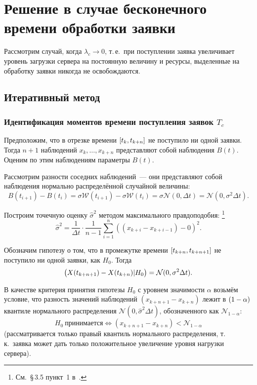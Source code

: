 \documentclass[a4paper,10pt]{article}
\begin{document}
\section{Решение в случае бесконечного времени обработки заявки}
Рассмотрим случай, когда $\lambda_c \rightarrow 0$, 
т.\,е.~при поступлении заявка увеличивает уровень загрузки 
сервера на постоянную величину и ресурсы, выделенные на обработку заявки
никогда не освобождаются.

\subsection{Итеративный метод}%
\label{iterative}
\subsubsection{Идентификация моментов времени поступления заявок $T_c$}%
\label{lc0-iter-Tc}
Предположим, что в отрезке времени $\sbr{t_k, t_{k+n}}$ 
не поступило ни одной заявки.
Тогда $n + 1$ наблюдений $x_k,\ldots,x_{k+n}$ представляют собой наблюдения
$B(t)$.
Оценим по этим наблюдениям параметры $B(t)$.

Рассмотрим разности соседних наблюдений~--- они представляют собой наблюдения 
нормально распределённой случайной величины:
$$B(t_{i+1}) - B(t_i) = 
    \sigma \mathcal{W}(t_{i+1}) - \sigma \mathcal{W}(t_i) = 
    \sigma \mathcal{N}(0, \Delta t) = 
    \mathcal{N}(0, \sigma^2 \Delta t).$$

Построим точечную оценку $\widehat{\sigma}^2$ 
методом максимального правдоподобия:%
\footnote{См.~\S\,3.5 пункт~1 в~\cite{ivchmed2010matstat}.}
%
$$\widehat{\sigma}^2 = 
    \frac{1}{\Delta t}\cdot\frac{1}{n-1}
        \sum\limits_{i=1}^n ((x_{k+i} - x_{k+i-1}) - 0)^2.$$

Обозначим гипотезу о том, что в промежутке времени 
$\sbr{t_{k+n}, t_{k+n+1}}$ не поступило ни одной заявки, 
как $H_0$.
Тогда 
$$\del{X(t_{k+n+1})-X(t_{k+n}) \vert H_0} = 
    \mathcal{N}(0, \sigma^2 \Delta t).$$

В качестве критерия принятия гипотезы $H_0$ с уровнем значимости 
$\alpha$ 
возьмём условие, что разность значений наблюдений $(x_{k+n+1}-x_{k+n})$
лежит в $\del{1 - \alpha}$ квантиле
нормального распределения $\mathcal{N}(0, \widehat{\sigma}^2 \Delta t)$,
обозначенного как $\mathcal{N}_{1 - \alpha}$:
$$
H_0 \  \mathrm{\text{принимается}} \iff
        (x_{k+n+1}-x_{k+n}) < 
	    \mathcal{N}_{1 - \alpha}
$$
(рассматривается только правый квантиль нормального распределения, 
т.\,к.~заявка может дать только положительное увеличение уровня нагрузки 
сервера).
\end{document}
